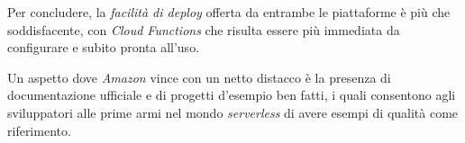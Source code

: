 Per concludere, la \textit{facilità di deploy} offerta da entrambe le piattaforme è più che soddisfacente, con \textit{Cloud Functions} che risulta essere più immediata da configurare e subito pronta all'uso.

Un aspetto dove \textit{Amazon} vince con un netto distacco è la presenza di documentazione ufficiale e di progetti d'esempio ben fatti, i quali consentono agli sviluppatori alle prime armi nel mondo \textit{serverless} di avere esempi di qualità come riferimento.